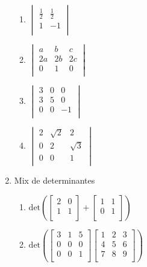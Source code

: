 \documentclass[a4paper]{article}
\begin{document}
\begin{multicols}{2}
\begin{enumerate}
\begin{enumerate}
\item 
$
\begin{vmatrix}
  \frac{1}{2} & \frac{1}{2}\\
  1 & -1\\
\end{vmatrix}
$

\item 
$
\begin{vmatrix}
  a & b & c\\
  2a & 2b & 2c\\
  0 & 1 & 0\\
\end{vmatrix}
$

\item 
$
\begin{vmatrix}
  3 & 0 & 0\\
  3 & 5 & 0\\
  0 & 0 & -1\\
\end{vmatrix}
$

\item 
$
\begin{vmatrix}
  2 & \sqrt{2} & 2\\
  0 & 2 & \sqrt{3}\\
  0 & 0 & 1\\
\end{vmatrix}
$

\end{enumerate}

\item Mix de determinantes

  \begin{enumerate}
\item 
$
\mathrm{det} \left(
\begin{bmatrix}
  2 & 0\\
  1 & 1\\
\end{bmatrix}
+
\begin{bmatrix}
  1 & 1\\
  0 & 1\\
\end{bmatrix}
\right)
$

\item 
$
\mathrm{det} \left(
\begin{bmatrix}
  3 & 1 & 5\\
  0 & 0 & 0\\
  0 & 0 & 1\\
\end{bmatrix}
\begin{bmatrix}
  1 & 2 & 3\\
  4 & 5 & 6\\
  7 &8 & 9\\
\end{bmatrix}
\right)
$


\end{enumerate}
\end{enumerate}
\end{multicols}
\end{document}

